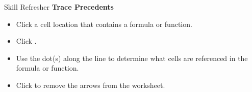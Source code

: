 \begin{center}
	\begin{sklbox}{Skill Refresher}
		\textbf{Trace Precedents}
		\\
		\begin{itemize}
			\setlength{\itemsep}{0pt}
			\setlength{\parskip}{0pt}
			\setlength{\parsep}{0pt}
			
			\item Click a cell location that contains a formula or function.
			\item Click .
			\item Use the dot(s) along the line to determine what cells are referenced in the formula or function.
			\item Click  to remove the arrows from the worksheet.
			
		\end{itemize}
	\end{sklbox}
\end{center}

